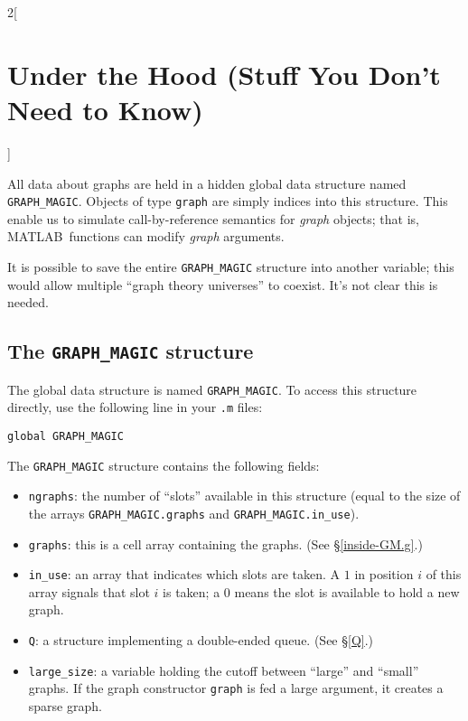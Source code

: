 \documentclass{amsart}
\newcommand\matlab{MATLAB}
\begin{document}
\begin{multicols}{2}[\section{Under the Hood (Stuff You Don't Need to Know)}]
\label{sect:under-the-hood}


All data about graphs are held in a hidden global data structure named
\verb|GRAPH_MAGIC|. Objects of type \verb|graph| are simply indices
into this structure. This enable us to simulate call-by-reference
semantics for \emph{graph} objects; that is, \matlab\ functions can
modify \emph{graph} arguments. 

It is possible to save the entire \verb|GRAPH_MAGIC| structure into
another variable; this would allow multiple ``graph theory universes''
to coexist. It's not clear this is needed.

\subsection{The \texttt{GRAPH\_MAGIC} structure}

The global data structure is named \verb|GRAPH_MAGIC|. To access this
structure directly, use the following line in your \verb|.m| files:
\begin{verbatim}
global GRAPH_MAGIC
\end{verbatim}

The \verb|GRAPH_MAGIC| structure contains the following fields:
\begin{itemize}
\item \verb|ngraphs|: the number of ``slots'' available in this
  structure (equal to the size of the arrays \verb|GRAPH_MAGIC.graphs|
  and \verb|GRAPH_MAGIC.in_use|).

\item \verb|graphs|: this is a cell array containing the graphs. (See
 \S\ref{inside-GM.g}.)


\item \verb|in_use|: an array that indicates which slots are taken. A
  $1$ in position $i$ of this array signals that slot $i$ is taken; a
  $0$ means the slot is available to hold a new graph.

\item \verb|Q|: a structure implementing a double-ended queue. (See \S\ref{Q}.)

\item \verb|large_size|: a variable holding the cutoff between
  ``large'' and ``small'' graphs. If the graph constructor
  \verb|graph| is fed a large argument, it creates a sparse graph. 
\end{itemize}


\end{multicols}
\end{document}

